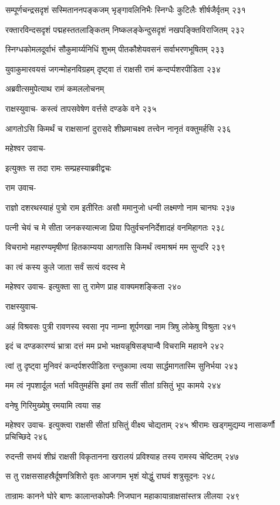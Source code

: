 सम्पूर्णचन्द्रसदृशं सस्मिताननपङ्कजम्
भृङ्गावलिनिभैः स्निग्धैः कुटिलैः शीर्षजैर्वृतम् २३१

रक्तारविन्दसदृशं पद्महस्ततलाङ्कितम्
निष्कलङ्केन्दुसदृशं नखपङ्क्तिविराजितम् २३२

स्निग्धकोमलदूर्वाभं सौकुमार्य्यनिधिं शुभम्
पीतकौशेयवसनं सर्वाभरणभूषितम् २३३

युवाकुमारवयसं जगन्मोहनविग्रहम्
दृष्ट्वा तं राक्षसी रामं कन्दर्प्पशरपीडिता २३४

अब्रवीत्समुपेत्याथ रामं कमललोचनम्

राक्षस्युवाच-
कस्त्वं तापसवेषेण वर्त्तसे दण्डके वने २३५

आगतोऽसि किमर्थं च राक्षसानां दुरासदे
शीघ्रमाचक्ष्व तत्त्वेन नानृतं वक्तुमर्हसि २३६

महेश्वर उवाच-

इत्युक्तः स तदा रामः सम्प्रहस्याब्रवीद्वचः

राम उवाच-

राज्ञो दशरथस्याहं पुत्रो राम इतीरितः
असौ ममानुजो धन्वी लक्ष्मणो नाम चानघः २३७

पत्नी चेयं च मे सीता जनकस्यात्मजा प्रिया
पितुर्वचननिर्देशादहं वनमिहागतः २३८

विचरामो महारण्यमृषीणां हितकाम्यया
आगतासि किमर्थं त्वमाश्रमं मम सुन्दरि २३९

का त्वं कस्य कुले जाता सर्वं सत्यं वदस्व मे

महेश्वर उवाच-
इत्युक्ता सा तु रामेण प्राह वाक्यमशङ्किता २४०

राक्षस्युवाच-

अहं विश्रवसः पुत्री रावणस्य स्वसा नृप
नाम्ना शूर्पणखा नाम त्रिषु लोकेषु विश्रुता २४१

इदं च दण्डकारण्यं भ्रात्रा दत्तं मम प्रभो
भक्षयन्नृषिसङ्घान्वै विचरामि महावने २४२

त्वां तु दृष्ट्वा मुनिवरं कन्दर्पशरपीडिता
रन्तुकामा त्वया सार्द्धमागतास्मि सुनिर्भया २४३

मम त्वं नृपशार्दूल भर्ता भवितुमर्हसि
इमां तव सतीं सीतां ग्रसितुं भूप कामये २४४

वनेषु गिरिमुख्येषु रमयामि त्वया सह

महेश्वर उवाच-
इत्युक्त्वा राक्षसी सीतां ग्रसितुं वीक्ष्य चोद्यताम् २४५
श्रीरामः खड्गमुद्यम्य नासाकर्णौ प्रचिच्छिदे २४६

रुदन्ती सभयं शीघ्रं राक्षसी विकृतानना
खरालयं प्रविश्याह तस्य रामस्य चेष्टितम् २४७

स तु राक्षससाहस्रैर्दूषणत्रिशिरो वृतः
आजगाम भृशं योद्धुं राघवं शत्रुसूदनः २४८

तान्रामः कानने घोरे बाणः कालान्तकोपमैः
निजघान महाकायान्राक्षसांस्तत्र लीलया २४९

